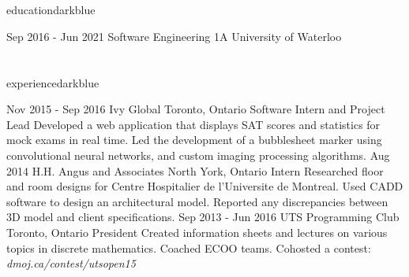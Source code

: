\documentclass{resume}
\begin{document}
	\begin{main}
		\vspace{10pt}%
		\section{\faBook}{education}{darkblue}
			\begin{entrylist}
				\rightentry%
				{Sep 2016 - Jun 2021}%
				{Software Engineering 1A}%
				{University of Waterloo}%
				{}{}
			\end{entrylist}
		\section{\faBriefcase}{experience}{darkblue}
			\begin{entrylist}
				\rightentry%
					{Nov 2015 - Sep 2016}%
					{Ivy Global}%
					{Toronto, Ontario}%
					{Software Intern and Project Lead}%
					{Developed a web application that displays SAT scores and statistics for mock exams in real time. Led the development of a bubblesheet marker using convolutional neural networks, and custom imaging processing algorithms.}
				\rightentry%
					{Aug 2014}%
					{H.H. Angus and Associates}%
					{North York, Ontario}%
					{Intern}%
					{Researched floor and room designs for Centre Hospitalier de l'Universite de Montreal. Used CADD software to design an architectural model. Reported any discrepancies between 3D model and client specifications.}
				\rightentry%
					{Sep 2013 - Jun 2016}%
					{UTS Programming Club}%
					{Toronto, Ontario}%
					{President}%
					{Created information sheets and lectures on various topics in discrete mathematics. Coached ECOO teams. Cohosted a contest: \emph{dmoj.ca/contest/utsopen15}}
			\end{entrylist}

\end{main}
\end{document}
